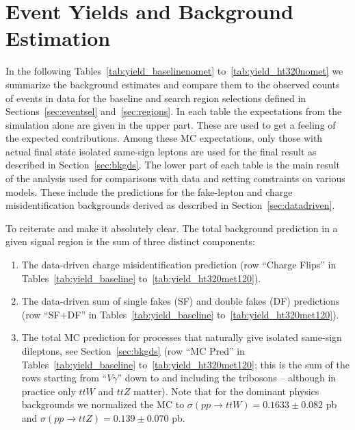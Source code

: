 \section{Event Yields and Background Estimation}
\label{sec:yields}

In the following Tables~\ref{tab:yield_baselinenomet} 
to~\ref{tab:yield_ht320nomet}
we summarize the background 
estimates and compare them to the
observed counts of events in data for the baseline and search region selections
defined in Sections~\ref{sec:eventsel} and~\ref{sec:regions}.
In each table the expectations from the simulation alone are given 
in the upper part.
 These are used to get a feeling of the expected contributions.
Among these MC expectations, 
only those with actual final state 
isolated same-sign leptons are used for the final result
as described in Section~\ref{sec:bkgds}.
The lower part of each table is the main result of the analysis
used for comparisons with data and setting constraints on various models.
These include the predictions for the fake-lepton and charge misidentification
backgrounds derived as described in Section~\ref{sec:datadriven}.

To reiterate and make it absolutely clear.  The total background
prediction in a given signal region
is the sum of three distinct components:
\begin{enumerate}

\item The data-driven charge misidentification prediction (row ``Charge Flips'' in
Tables~\ref{tab:yield_baseline} to~\ref{tab:yield_ht320met120}).

\item The data-driven sum of single fakes (SF) and double fakes
(DF) predictions (row ``SF$+$DF''
in Tables~\ref{tab:yield_baseline} to~\ref{tab:yield_ht320met120}).

\item The total MC prediction for processes that naturally give isolated
same-sign dileptons, see Section~\ref{sec:bkgds} (row ``MC Pred'' in
Tables~\ref{tab:yield_baseline} to~\ref{tab:yield_ht320met120};
this is the sum of the rows starting from ``$V\gamma$'' down to 
and including the tribosons -- although in practice only $ttW$ and 
$ttZ$ matter).  Note that for the dominant physics 
backgrounds we normalized the MC to $\sigma(pp \to ttW) = 0.1633 \pm 0.082$
pb and $\sigma(pp \to ttZ) = 0.139 \pm 0.070$ pb.

\end{enumerate}

